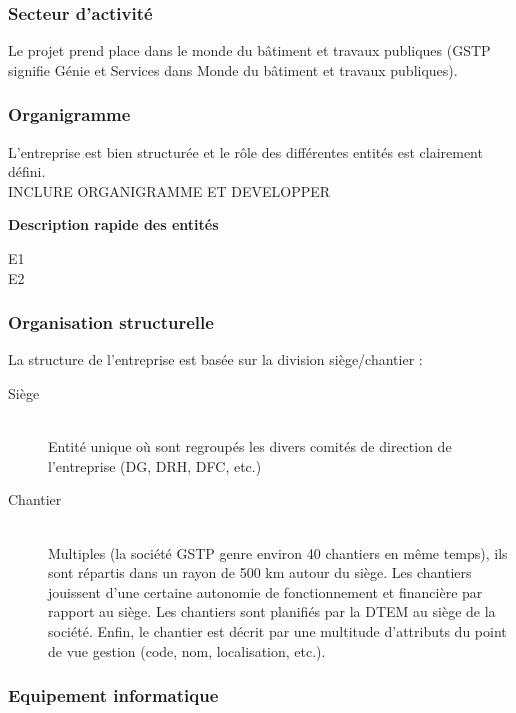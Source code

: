 \documentclass[12pt]{article}
\begin{document}
\subsubsection{Secteur d'activité}
Le projet prend place dans le monde du bâtiment et travaux publiques (GSTP
signifie Génie et Services dans Monde du bâtiment et travaux publiques).


\subsubsection{Organigramme}
L'entreprise est bien structurée et le rôle des différentes entités est clairement défini.\\

INCLURE ORGANIGRAMME ET DEVELOPPER

\textbf{Description rapide des entités}\hfill\\
\begin{description}

\item[E1]
\item[E2]

\end{description}


\subsubsection{Organisation structurelle}

La structure de l'entreprise est basée sur la division siège/chantier :
\begin{description}
\item[Siège]\hfill\\ 
Entité unique où sont regroupés les divers comités de direction de l'entreprise (DG, DRH, DFC, etc.)

\item[Chantier]\hfill\\
Multiples (la société GSTP genre environ 40 chantiers en même temps),
ils sont répartis dans un rayon de 500 km autour du siège.
Les chantiers jouissent d'une certaine autonomie de fonctionnement et
financière par rapport au siège. Les chantiers sont planifiés par la DTEM
au siège de la société. Enfin, le chantier est décrit par une multitude
d'attributs du point de vue gestion (code, nom, localisation, etc.).\\
\end{description}


\subsubsection{Equipement informatique}
\end{document}
